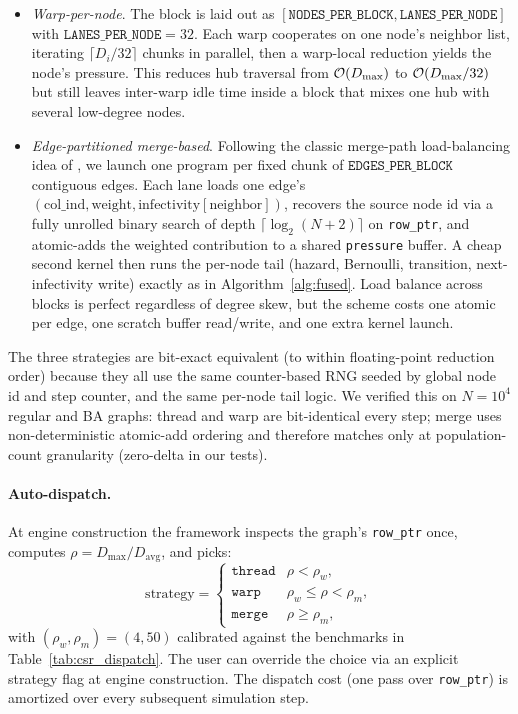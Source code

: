\begin{itemize}
\item \emph{Warp-per-node}. The block is laid out as $[\texttt{NODES\_PER\_BLOCK}, \texttt{LANES\_PER\_NODE}]$ with $\texttt{LANES\_PER\_NODE}=32$. Each warp cooperates on one node's neighbor list, iterating $\lceil D_i / 32\rceil$ chunks in parallel, then a warp-local reduction yields the node's pressure. This reduces hub traversal from $\mathcal{O}(D_{\max})$ to $\mathcal{O}(D_{\max}/32)$ but still leaves inter-warp idle time inside a block that mixes one hub with several low-degree nodes.
\item \emph{Edge-partitioned merge-based}. Following the classic merge-path load-balancing idea of \citet{merrill2016merge}, we launch one program per fixed chunk of $\texttt{EDGES\_PER\_BLOCK}$ contiguous edges. Each lane loads one edge's $(\text{col\_ind}, \text{weight}, \text{infectivity}[\text{neighbor}])$, recovers the source node id via a fully unrolled binary search of depth $\lceil \log_2(N+2)\rceil$ on \texttt{row\_ptr}, and atomic-adds the weighted contribution to a shared \texttt{pressure} buffer. A cheap second kernel then runs the per-node tail (hazard, Bernoulli, transition, next-infectivity write) exactly as in Algorithm~\ref{alg:fused}. Load balance across blocks is perfect regardless of degree skew, but the scheme costs one atomic per edge, one scratch buffer read/write, and one extra kernel launch.
\end{itemize}

The three strategies are bit-exact equivalent (to within floating-point reduction order) because they all use the same counter-based RNG seeded by global node id and step counter, and the same per-node tail logic. We verified this on $N=10^4$ regular and BA graphs: thread and warp are bit-identical every step; merge uses non-deterministic atomic-add ordering and therefore matches only at population-count granularity (zero-delta in our tests).

\paragraph{Auto-dispatch.} At engine construction the framework inspects the graph's \texttt{row\_ptr} once, computes $\rho = D_{\max}/D_{\mathrm{avg}}$, and picks:
\begin{equation*}
\text{strategy} = \begin{cases}
\texttt{thread} & \rho < \rho_w,\\
\texttt{warp}   & \rho_w \leq \rho < \rho_m,\\
\texttt{merge}  & \rho \geq \rho_m,
\end{cases}
\end{equation*}
with $(\rho_w, \rho_m) = (4, 50)$ calibrated against the benchmarks in Table~\ref{tab:csr_dispatch}. The user can override the choice via an explicit strategy flag at engine construction. The dispatch cost (one pass over \texttt{row\_ptr}) is amortized over every subsequent simulation step.

